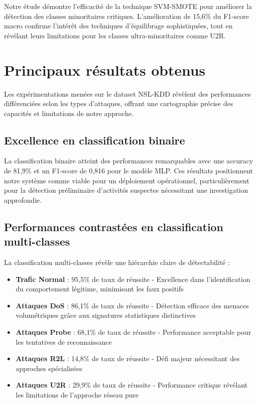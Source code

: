 Notre étude démontre l'efficacité de la technique SVM-SMOTE pour améliorer la détection des classes minoritaires critiques. L'amélioration de 15,6\% du F1-score macro confirme l'intérêt des techniques d'équilibrage sophistiquées, tout en révélant leurs limitations pour les classes ultra-minoritaires comme U2R.

\section{Principaux résultats obtenus}

Les expérimentations menées sur le dataset NSL-KDD révèlent des performances différenciées selon les types d'attaques, offrant une cartographie précise des capacités et limitations de notre approche.

\subsection{Excellence en classification binaire}

La classification binaire atteint des performances remarquables avec une accuracy de 81,9\% et un F1-score de 0,816 pour le modèle MLP. Ces résultats positionnent notre système comme viable pour un déploiement opérationnel, particulièrement pour la détection préliminaire d'activités suspectes nécessitant une investigation approfondie.

\subsection{Performances contrastées en classification multi-classes}

La classification multi-classes révèle une hiérarchie claire de détectabilité :

\begin{itemize}
    \item \textbf{Trafic Normal} : 95,5\% de taux de réussite - Excellence dans l'identification du comportement légitime, minimisant les faux positifs
    \item \textbf{Attaques DoS} : 86,1\% de taux de réussite - Détection efficace des menaces volumétriques grâce aux signatures statistiques distinctives
    \item \textbf{Attaques Probe} : 68,1\% de taux de réussite - Performance acceptable pour les tentatives de reconnaissance
    \item \textbf{Attaques R2L} : 14,8\% de taux de réussite - Défi majeur nécessitant des approches spécialisées
    \item \textbf{Attaques U2R} : 29,9\% de taux de réussite - Performance critique révélant les limitations de l'approche réseau pure
\end{itemize}

